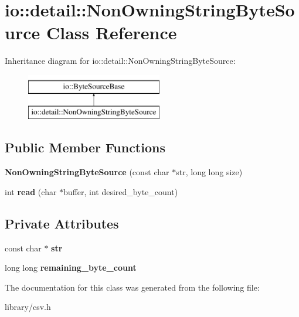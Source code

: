 \hypertarget{classio_1_1detail_1_1NonOwningStringByteSource}{}\section{io\+:\+:detail\+:\+:Non\+Owning\+String\+Byte\+Source Class Reference}
\label{classio_1_1detail_1_1NonOwningStringByteSource}
Inheritance diagram for io\+:\+:detail\+:\+:Non\+Owning\+String\+Byte\+Source\+:\begin{figure}[H]
\begin{center}
\leavevmode
\includegraphics[height=2.000000cm]{classio_1_1detail_1_1NonOwningStringByteSource}
\end{center}
\end{figure}
\subsection*{Public Member Functions}
\begin{DoxyCompactItemize}
\item 
\mbox{\label{classio_1_1detail_1_1NonOwningStringByteSource_a8fd604017b38e20f90386b6e10bd95a3}} 
{\bfseries Non\+Owning\+String\+Byte\+Source} (const char $\ast$str, long long size)
\item 
\mbox{\label{classio_1_1detail_1_1NonOwningStringByteSource_aba194be7e3a141f40d683db483a620bb}} 
int {\bfseries read} (char $\ast$buffer, int desired\+\_\+byte\+\_\+count)
\end{DoxyCompactItemize}
\subsection*{Private Attributes}
\begin{DoxyCompactItemize}
\item 
\mbox{\label{classio_1_1detail_1_1NonOwningStringByteSource_ad130b4796eb5758c3e512d585af51bef}} 
const char $\ast$ {\bfseries str}
\item 
\mbox{\label{classio_1_1detail_1_1NonOwningStringByteSource_aa2097ba0c3c49f0266ec1fbc8f322947}} 
long long {\bfseries remaining\+\_\+byte\+\_\+count}
\end{DoxyCompactItemize}


The documentation for this class was generated from the following file\+:\begin{DoxyCompactItemize}
\item 
library/csv.\+h\end{DoxyCompactItemize}

